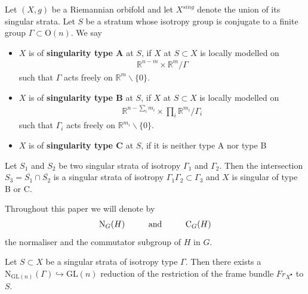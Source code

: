 \documentclass[psamsfonts]{amsart}
\theoremstyle{plain}
\theoremstyle{definition}{
\newtheorem{defi}{Definition}[section]
\newtheorem{ass}{Assumption}
\newtheorem*{nota}{Notation}}
\theoremstyle{remark}{
\newtheorem{rem}{Remark}
\newtheorem{ex}{Example}}
\theoremstyle{plain}{
\newtheorem{thm}{Theorem}[section]
\newtheorem{lem}{Lemma}[section]
\newtheorem{cor}{Corollary}[section]
\newtheorem{prop}{Proposition}[section]
\newtheorem{con}{Conjecture}[section]}
\newcommand{\m}[1]{{\mathrm{#1}}}
\newcommand{\und}[1]{\hspace{#1}\text{and}\hspace{#1}}
\begin{document}
\begin{defi}
Let $(X,g)$ be a Riemannian orbifold and let $X^{sing}$ denote the union of its singular strata. Let $S$ be a stratum whose isotropy group is conjugate to a finite group $\Gamma\subset\m{O}(n)$. We say
\begin{itemize}
    \item $X$ is of \textbf{singularity type A} at $S$, if $X$ at $S\subset X$ is locally modelled on
    \begin{align*}
    \mathbb{R}^{n-m}\times\mathbb{R}^m/\Gamma
    \end{align*}
    such that $\Gamma$ acts freely on $\mathbb{R}^m\backslash\{0\}$.
    \item $X$ is of \textbf{singularity type B} at $S$, if $X$ at $S\subset X$ is locally modelled on
    \begin{align*}
    \mathbb{R}^{n-\sum_im_i}\times\prod_i\mathbb{R}^{m_i}/ \Gamma_i
    \end{align*}
    such that $ \Gamma_i$ acts freely on $\mathbb{R}^{m_i}\backslash\{0\}$.
    \item $X$ is of \textbf{singularity type C} at $S$, if it is neither type A nor type B
\end{itemize}
\end{defi}

\begin{rem}
Let $S_1$ and $S_2$ be two singular strata of isotropy $ \Gamma_1$ and $ \Gamma_2$. Then the intersection $S_3=\overline{S_1}\cap\overline{S_2}$ is a singular strata of isotropy $ \Gamma_1 \Gamma_2\subset \Gamma_3$ and $X$ is singular of type B or C.
\end{rem}


\begin{nota}
    Throughout this paper we will denote by 
    \begin{align*}
        \m{N}_G(H)\und{1.0cm} \m{C}_G(H)
    \end{align*}
    the normaliser and the commutator subgroup of $H$ in $G$.
\end{nota}

\begin{prop}
Let $S\subset X$ be a singular strata of isotropy type $\Gamma$. Then there exists a $\m{N}_{\m{GL}(n)}(\Gamma)\hookrightarrow \m{GL}(n)$ reduction of the restriction of the frame bundle $Fr_{X^\bullet}$ to $S$.
\end{prop}
\end{document}
